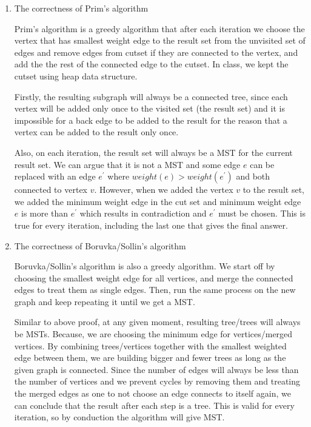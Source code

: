 \documentclass{article}
\begin{document}
\begin{enumerate}
    \item The correctness of Prim's algorithm

    Prim's algorithm is a greedy algorithm that after each iteration we choose the vertex that has smallest weight edge to the result set from the unvisited set of edges and remove edges from cutset if they are connected to the vertex, and add the the rest of the connected edge to the cutset. In class, we kept the cutset using heap data structure.

    Firstly, the resulting subgraph will always be a connected tree, since each vertex will be added only once to the visited set (the result set) and it is impossible for a back edge to be added to the result for the reason that a vertex can be added to the result only once.

    Also, on each iteration, the result set will always be a MST for the current result set. We can argue that it is not a MST and some edge $e$ can be replaced with an edge $e^\prime$ where $weight(e)>weight(e^\prime)$ and both connected to vertex $v$. However, when we added the vertex $v$ to the result set, we added the minimum weight edge in the cut set and minimum weight edge $e$ is more than $e^\prime$ which results in contradiction and $e^\prime$ must be chosen. This is true for every iteration, including the last one that gives the final answer.

    \item The correctness of Boruvka/Sollin's algorithm

    Boruvka/Sollin's algorithm is also a greedy algorithm. We start off by choosing the smallest weight edge for all vertices, and merge the connected edges to treat them as single edges. Then, run the same process on the new graph and keep repeating it until we get a MST.

    Similar to above proof, at any given moment, resulting tree/trees will always be MSTs. Because, we are choosing the minimum edge for vertices/merged vertices. By combining trees/vertices together with the smallest weighted edge between them, we are building bigger and fewer trees as long as the given graph is connected. Since the number of edges will always be less than the number of vertices and we prevent cycles by removing them and treating the merged edges as one to not choose an edge connects to itself again, we can conclude that the result after each step is a tree. This is valid for every iteration, so by conduction the algorithm will give MST.


\end{enumerate}
\end{document}
